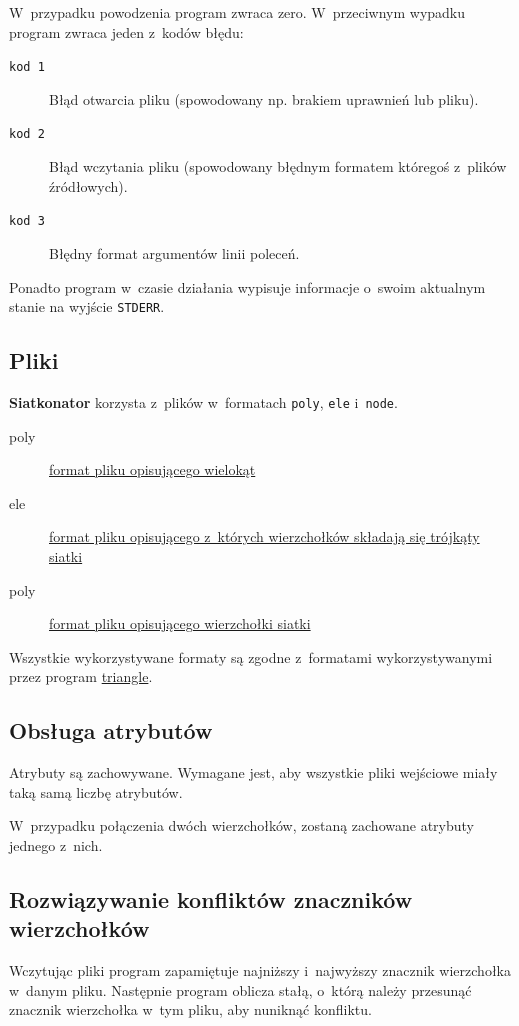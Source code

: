 \documentclass[a4paper]{article} \usepackage{setspace}
\newcommand{\siatkonator}{\textbf{Siatkonator} }
\renewcommand{\triangle}{\href{http://www.cs.cmu.edu/~quake/triangle.html}{triangle}}
\begin{document}
W~przypadku powodzenia program zwraca zero. W~przeciwnym wypadku program zwraca jeden z~kodów błędu:

\begin{description}
  \item[\texttt{kod 1}] Błąd otwarcia pliku (spowodowany np. brakiem uprawnień lub pliku).
  \item[\texttt{kod 2}] Błąd wczytania pliku (spowodowany błędnym formatem któregoś z~plików źródłowych).
  \item[\texttt{kod 3}] Błędny format argumentów linii poleceń.
\end{description}

Ponadto program w~czasie działania wypisuje informacje o~swoim aktualnym stanie na wyjście \texttt{STDERR}.

\subsection{Pliki}
\siatkonator korzysta z~plików w~formatach \texttt{poly}, \texttt{ele} i~\texttt{node}.

\begin{description}
  \item[poly] \href{http://www.cs.cmu.edu/~quake/triangle.poly.html}{format pliku opisującego wielokąt}
  \item[ele] \href{http://www.cs.cmu.edu/~quake/triangle.ele.html}{format pliku opisującego z~których wierzchołków składają się trójkąty siatki}
  \item[poly] \href{http://www.cs.cmu.edu/~quake/triangle.poly.html}{format pliku opisującego wierzchołki siatki}
\end{description}

Wszystkie wykorzystywane formaty są zgodne z~formatami wykorzystywanymi przez program \triangle.

\subsection{Obsługa atrybutów}
Atrybuty są zachowywane.
Wymagane jest, aby wszystkie pliki wejściowe miały taką samą liczbę atrybutów.

W~przypadku połączenia dwóch wierzchołków, zostaną zachowane atrybuty jednego z~nich.

\subsection{Rozwiązywanie konfliktów znaczników wierzchołków}
Wczytując pliki program zapamiętuje najniższy i~najwyższy znacznik wierzchołka w~danym pliku.
Następnie program oblicza stałą, o~którą należy przesunąć znacznik wierzchołka w~tym pliku, aby nuniknąć konfliktu.
\end{document}
